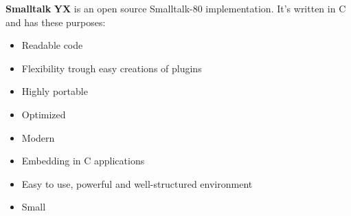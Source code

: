 {\bf Smalltalk} {\bf YX} is an open source Smalltalk-80 implementation. It's written in C and has these purposes:

\begin{itemize}
\item Readable code\item Flexibility trough easy creations of plugins\item Highly portable\item Optimized\item Modern\item Embedding in C applications\item Easy to use, powerful and well-structured environment\item Small \end{itemize}
